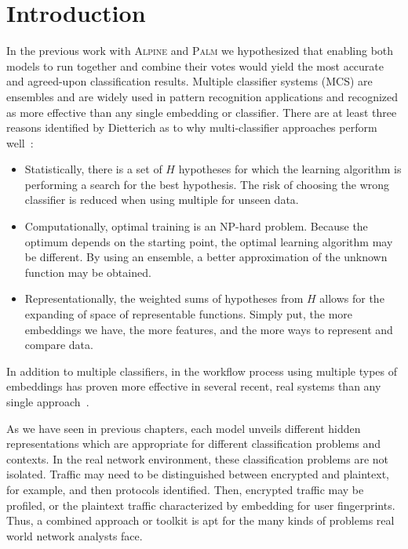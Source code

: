 \section{Introduction}

In the previous work with \textsc{Alpine} and \textsc{Palm} we hypothesized that enabling both models to run together and combine their votes would yield the most accurate and agreed-upon classification results. Multiple classifier systems (MCS) are ensembles and are widely used in pattern recognition applications and recognized as more effective than any single embedding or classifier. There are at least three reasons identified by Dietterich as to why multi-classifier approaches perform well~\cite{dietterich2000ensemble}:

\begin{itemize}
    \item Statistically, there is a set of $H$ hypotheses for which the learning algorithm is performing a search for the best hypothesis. The risk of choosing the wrong classifier is reduced when using multiple for unseen data.
    \item Computationally, optimal training is an NP-hard problem. Because the optimum depends on the starting point, the optimal learning algorithm may be different. By using an ensemble, a better approximation of the unknown function may be obtained.
    \item Representationally, the weighted sums of hypotheses from $H$ allows for the expanding of space of representable functions. Simply put, the more embeddings we have, the more features, and the more ways to represent and compare data.
\end{itemize}

In addition to multiple classifiers, in the workflow process using multiple types of embeddings has proven more effective in several recent, real systems than any single approach~\cite{tajaddodianfar2020texception, instruction2vec, duarte2019semi, yang2022, ayoade2020evolving, palau2020dns, kishioka2018, Boyaci2022, glass}.

As we have seen in previous chapters, each model unveils different hidden representations which are appropriate for different classification problems and contexts. In the real network environment, these classification problems are not isolated. Traffic may need to be distinguished between encrypted and plaintext, for example, and then protocols identified. Then, encrypted traffic may be profiled, or the plaintext traffic characterized by embedding for user fingerprints. Thus, a combined approach or toolkit is apt for the many kinds of problems real world network analysts face.


